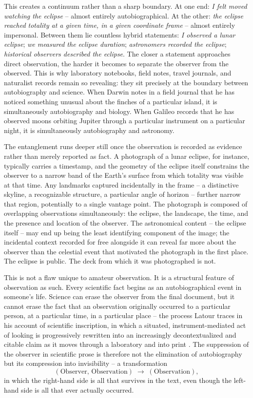 \documentclass[11pt]{article}
\theoremstyle{plain}
\begin{document}
This creates a continuum rather than a sharp boundary. At one end: \emph{I felt moved watching the eclipse} -- almost entirely autobiographical. At the other: \emph{the eclipse reached totality at a given time, in a given coordinate frame} -- almost entirely impersonal. Between them lie countless hybrid statements: \emph{I observed a lunar eclipse}; \emph{we measured the eclipse duration}; \emph{astronomers recorded the eclipse}; \emph{historical observers described the eclipse}. The closer a statement approaches direct observation, the harder it becomes to separate the observer from the observed. This is why laboratory notebooks, field notes, travel journals, and naturalist records remain so revealing: they sit precisely at the boundary between autobiography and science. When Darwin notes in a field journal that he has noticed something unusual about the finches of a particular island, it is simultaneously autobiography and biology. When Galileo records that he has observed moons orbiting Jupiter through a particular instrument on a particular night, it is simultaneously autobiography and astronomy.

The entanglement runs deeper still once the observation is recorded as evidence rather than merely reported as fact. A photograph of a lunar eclipse, for instance, typically carries a timestamp, and the geometry of the eclipse itself constrains the observer to a narrow band of the Earth's surface from which totality was visible at that time. Any landmarks captured incidentally in the frame -- a distinctive skyline, a recognizable structure, a particular angle of horizon -- further narrow that region, potentially to a single vantage point. The photograph is composed of overlapping observations simultaneously: the eclipse, the landscape, the time, and the presence and location of the observer. The astronomical content -- the eclipse itself -- may end up being the least identifying component of the image; the incidental context recorded for free alongside it can reveal far more about the observer than the celestial event that motivated the photograph in the first place. The eclipse is public. The deck from which it was photographed is not.

This is not a flaw unique to amateur observation. It is a structural feature of observation as such. Every scientific fact begins as an autobiographical event in someone's life. Science can erase the observer from the final document, but it cannot erase the fact that an observation originally occurred to a particular person, at a particular time, in a particular place -- the process Latour traces in his account of scientific inscription, in which a situated, instrument-mediated act of looking is progressively rewritten into an increasingly decontextualized and citable claim as it moves through a laboratory and into print \cite{latour1987}. The suppression of the observer in scientific prose is therefore not the elimination of autobiography but its compression into invisibility -- a transformation
\[
(\text{Observer},\,\text{Observation}) \;\longrightarrow\; (\text{Observation}),
\]
in which the right-hand side is all that survives in the text, even though the left-hand side is all that ever actually occurred.
\end{document}
